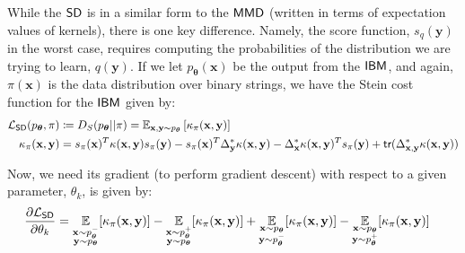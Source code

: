 While the $\operatorname{\textsf{SD}}$ is in a similar form to the $\operatorname{\textsf{MMD}}$ (written in terms of expectation values of kernels), there is one key difference. Namely, the score function, $s_q(\mathbf{y})$ in the worst case, requires computing the probabilities of the distribution we are trying to learn, $q(\mathbf{y})$. If we let $p_{\boldsymbol\theta}(\mathbf{x})$ be the output from the $\textsf{IBM}$, and again, $\pi(\mathbf{x})$ is the data distribution over binary strings, we have the Stein cost function for the $\textsf{IBM}$ given by:
\begin{align}
    \mathcal{L}_{\operatorname{\textsf{SD}}}(p_{\boldsymbol\theta}, \pi) &  \coloneqq D_S(p_{\boldsymbol\theta}||\pi)  = \mathbb{E}_{\mathbf{x}, \mathbf{y}\sim p_{\boldsymbol\theta}}\left[\kappa_\pi(\mathbf{x}, \mathbf{y})\right]\label{steindiscrepancybornmachine_supp}\\
    \kappa_\pi(\mathbf{x}, \mathbf{y}) &= s_\pi(\mathbf{x})^T\kappa(\mathbf{x}, \mathbf{y})s_\pi(\mathbf{y}) -s_\pi(\mathbf{x})^T\Delta_{\mathbf{y}}^*\kappa(\mathbf{x}, \mathbf{y})  - \Delta_{\mathbf{x}}^*\kappa(\mathbf{x}, \mathbf{y})^Ts_\pi(\mathbf{y}) + \textsf{tr}(\Delta_{\mathbf{x}, \mathbf{y}}^*\kappa(\mathbf{x}, \mathbf{y})) \label{weightedkernelbornmachine_supp}
\end{align}

Now, we need its gradient (to perform gradient descent) with respect to a given parameter, $\theta_k$, is given by:
\begin{align}
    \frac{\partial \mathcal{L}_{\operatorname{\textsf{SD}}}}{\partial \theta_k} &= \underset{\substack{\mathbf{x} \sim p^-_{\boldsymbol\theta} \\ \mathbf{y}\sim p_{\boldsymbol\theta}}}{\mathbb{E}}[\kappa_\pi(\mathbf{x}, \mathbf{y})] - \underset{\substack{\mathbf{x} \sim p^+_{\boldsymbol\theta} \\ \mathbf{y}\sim p_{\boldsymbol\theta}}}{\mathbb{E}}[\kappa_\pi(\mathbf{x}, \mathbf{y})] +\underset{\substack{\mathbf{x} \sim p_{\boldsymbol\theta}\\ \mathbf{y}\sim p^-_{\boldsymbol\theta}}}{\mathbb{E}}[\kappa_\pi(\mathbf{x}, \mathbf{y})] - \underset{\substack{\mathbf{x} \sim p_{\boldsymbol\theta} \\ \mathbf{y}\sim p^+_{\boldsymbol\theta}}}{\mathbb{E}}[\kappa_\pi(\mathbf{x}, \mathbf{y})] \label{steingradient_supp}
\end{align}

